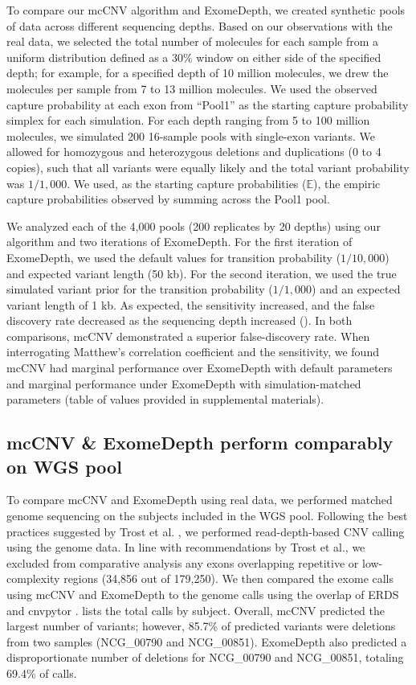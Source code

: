 \documentclass{bmcart}\usepackage[]{graphicx}\usepackage[]{color}
\begin{document}
To compare our mcCNV algorithm and ExomeDepth, we created synthetic pools of data across different sequencing depths.
Based on our observations with the real data, we selected the total number of molecules for each sample from a uniform distribution defined as a 30\% window on either side of the specified depth; for example, for a specified depth of 10 million molecules, we drew the molecules per sample from 7 to 13 million molecules.
We used the observed capture probability at each exon from ``Pool1'' as the starting capture probability simplex for each simulation.
For each depth ranging from 5 to 100 million molecules, we simulated 200 16-sample pools with single-exon variants.
We allowed for homozygous and heterozygous deletions and duplications (0 to 4 copies), such that all variants were equally likely and the total variant probability was $1/1,000$.
We used, as the starting capture probabilities ($\mathbb{E}$), the empiric capture probabilities observed by summing across the Pool1 pool.

We analyzed each of the 4,000 pools (200 replicates by 20 depths) using our algorithm and two iterations of ExomeDepth.
For the first iteration of ExomeDepth, we used the default values for transition probability ($1/10,000$) and expected variant length (50 kb).
For the second iteration, we used the true simulated variant prior for the transition probability ($1/1,000$) and an expected variant length of 1 kb.
As expected, the sensitivity increased, and the false discovery rate decreased as the sequencing depth increased ().
In both comparisons, mcCNV demonstrated a superior false-discovery rate.
When interrogating Matthew's correlation coefficient \cite{matthews:1975aa} and the sensitivity, we found mcCNV had marginal performance over ExomeDepth with default parameters and marginal performance under ExomeDepth with simulation-matched parameters (table of values provided in supplemental materials).

\subsection{mcCNV \& ExomeDepth perform comparably on WGS pool}

To compare mcCNV and ExomeDepth using real data, we performed matched genome sequencing on the subjects included in the WGS pool.
Following the best practices suggested by Trost et al. \cite{trost:2018aa}, we performed read-depth-based CNV calling using the genome data.
In line with recommendations by Trost et al., we excluded from comparative  analysis any exons overlapping repetitive or low-complexity regions (34,856 out of 179,250).
We then compared the exome calls using mcCNV and ExomeDepth to the genome calls using the overlap of ERDS \cite{zhu:2012aa} and cnvpytor \cite{abyzov:2011aa}.
 lists the total calls by subject.
Overall, mcCNV predicted the largest number of variants; however, 85.7\% of predicted variants were deletions from two samples (NCG\_00790 and NCG\_00851).
ExomeDepth also predicted a disproportionate number of deletions for NCG\_00790 and NCG\_00851, totaling 69.4\% of calls.
\end{document}

